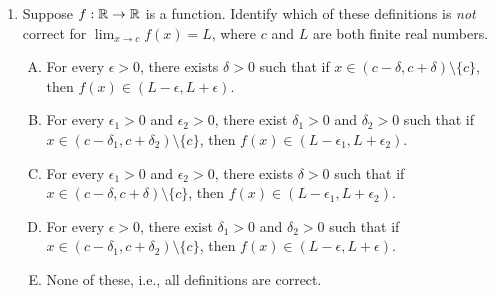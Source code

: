 \documentclass[10pt]{amsart}
\begin{document}
\begin{enumerate}
  \begin{enumerate}[(A)]
  \item $1,2,3,3,3$
  \item $1,2,3,2,3$
  \item $1,2,3,2,1$
  \item $1,2,3,4,5$
  \item $1,2,3,4,3$
  \end{enumerate}

  {\em Answer}: Option (C).

  {\em Explanation}: For a sequence obtained by function iteration, it
  must be true that the successor of an element is uniquely determined
  by that element. For the sequence with first five terms $1,2,3,2,1$,
  we note that at one place in the sequence, $2$ is followed by $3$,
  but at another place, $2$ is followed by one. This is not possible,
  because $f(2)$ cannot be both $3$ and $1$.

  {\em Performance review}: Nobody got this correct! $10$ chose (A),
  $1$ chose (E).

  {\em Historical note (last year)}: $6$ out of $26$ people got this
  correct. $14$ people chose (A), $3$ people chose (B), $2$ chose (E),
  and $1$ chose (D).

\item Suppose $f:\mathbb{R} \to \mathbb{R}$ is a function. Identify which of these
  definitions is {\em not} correct for $\lim_{x \to c} f(x) = L$,
  where $c$ and $L$ are both finite real numbers.
  \begin{enumerate}[(A)]
  \item For every $\epsilon > 0$, there exists $\delta > 0$ such that
    if $x \in (c - \delta, c + \delta) \setminus \{ c \}$, then $f(x)
    \in (L - \epsilon, L + \epsilon)$.
  \item For every $\epsilon_1 > 0$ and $\epsilon_2 > 0$, there exist
    $\delta_1 > 0$ and $\delta_2 > 0$ such that if $x \in (c -
    \delta_1,c+\delta_2)\setminus \{ c \}$, then $f(x) \in (L -
    \epsilon_1, L + \epsilon_2)$.
  \item For every $\epsilon_1 > 0$ and $\epsilon_2 > 0$, there exists
    $\delta > 0$ such that if $x \in (c - \delta, c + \delta)
    \setminus \{ c \}$, then $f(x) \in (L - \epsilon_1, L + \epsilon_2)$.
  \item For every $\epsilon > 0$, there exist $\delta_1 > 0$ and
    $\delta_2 > 0$ such that if $x \in (c - \delta_1, c + \delta_2)
    \setminus \{ c \}$, then $f(x) \in (L - \epsilon, L + \epsilon)$.
  \item None of these, i.e., all definitions are correct.
  \end{enumerate}


\end{enumerate}
\end{document}
